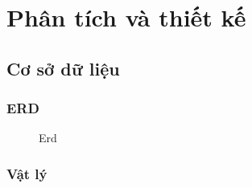 \documentclass[a4paper]{article}
\begin{document}
\newpage
\section{Phân tích và thiết kế}
\subsection{Cơ sở dữ liệu}
\subsubsection{ERD}
\begin{figure}[!htb]
    \centering
    \caption{Erd}
    \label{fig:enter-label}
\end{figure}
\subsubsection{Vật lý}
\newpage
\end{document}
